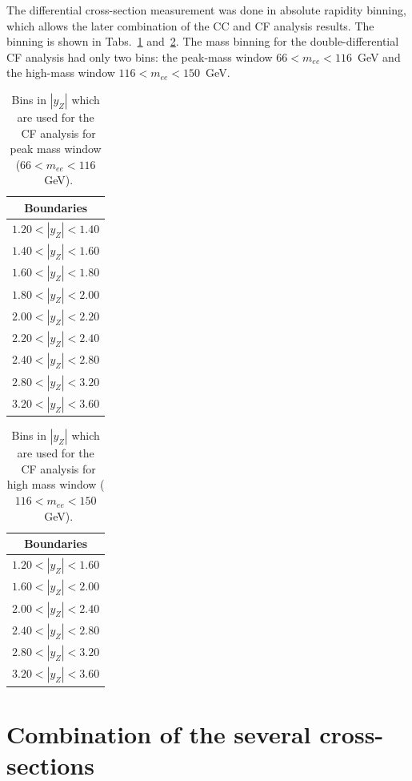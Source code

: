 The differential cross-section measurement was done in absolute rapidity binning, which allows the later combination of the CC and CF analysis results. The binning is shown in Tabs.~\ref{tab:ZeeCS_bins_peak} and~\ref{tab:ZeeCS_bins_high}. The mass binning for the double-differential CF analysis had only two bins: the peak-mass window $66 < m_{ee} < 116$~GeV and the high-mass window $116 < m_{ee} < 150$~GeV.

\begin{table}
\centering
\begin{tabular}{c}
\hline\hline
Boundaries\\\hline
$1.20 < |y_{Z}| <1.40$\\
$1.40 < |y_{Z}| <1.60$\\
$1.60 < |y_{Z}| <1.80$\\
$1.80 < |y_{Z}| <2.00$\\
$2.00 < |y_{Z}| <2.20$\\
$2.20 < |y_{Z}| <2.40$\\
$2.40 < |y_{Z}| <2.80$\\
$2.80 < |y_{Z}| <3.20$\\
$3.20 < |y_{Z}| <3.60$\\
\hline\hline
\end{tabular}
\caption{Bins in $|y_{Z}|$ which are used for the \Zee\ CF analysis for peak mass window ($66 < m_{ee} < 116$~GeV).}
\label{tab:ZeeCS_bins_peak}
\end{table}

\begin{table}
\centering
\begin{tabular}{c}
\hline\hline
Boundaries\\\hline
$1.20 < |y_{Z}| <1.60$\\
$1.60 < |y_{Z}| <2.00$\\
$2.00 < |y_{Z}| <2.40$\\
$2.40 < |y_{Z}| <2.80$\\
$2.80 < |y_{Z}| <3.20$\\
$3.20 < |y_{Z}| <3.60$\\
\hline\hline
\end{tabular}
\caption{Bins in $|y_{Z}|$ which are used for the \Zee\ CF analysis for high mass window ($116 < m_{ee} < 150$~GeV).}
\label{tab:ZeeCS_bins_high}
\end{table}

\section{Combination of the several cross-sections}
\label{sec:ZeeCS_comb}
